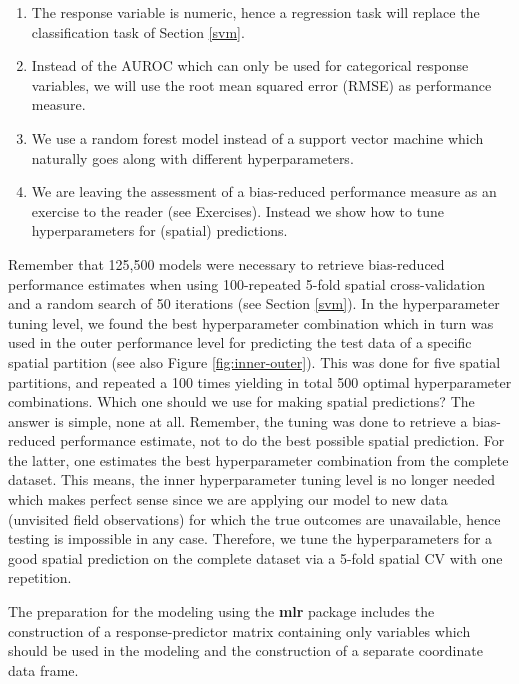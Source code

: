 \documentclass[]{krantz}
\providecommand{\tightlist}{%
  \setlength{\itemsep}{0pt}\setlength{\parskip}{0pt}}
\begin{document}
\begin{enumerate}
\def\labelenumi{\arabic{enumi}.}
\tightlist
\item
  The response variable is numeric, hence a regression task will replace the classification task of Section \ref{svm}.
\item
  Instead of the AUROC which can only be used for categorical response variables, we will use the root mean squared error (RMSE) as performance measure.
\item
  We use a random forest model instead of a support vector machine which naturally goes along with different hyperparameters.
\item
  We are leaving the assessment of a bias-reduced performance measure as an exercise to the reader (see Exercises).
  Instead we show how to tune hyperparameters for (spatial) predictions.
\end{enumerate}

Remember that 125,500 models were necessary to retrieve bias-reduced performance estimates when using 100-repeated 5-fold spatial cross-validation and a random search of 50 iterations (see Section \ref{svm}).
In the hyperparameter tuning level, we found the best hyperparameter combination which in turn was used in the outer performance level for predicting the test data of a specific spatial partition (see also Figure \ref{fig:inner-outer}).
This was done for five spatial partitions, and repeated a 100 times yielding in total 500 optimal hyperparameter combinations.
Which one should we use for making spatial predictions?
The answer is simple, none at all.
Remember, the tuning was done to retrieve a bias-reduced performance estimate, not to do the best possible spatial prediction.
For the latter, one estimates the best hyperparameter combination from the complete dataset.
This means, the inner hyperparameter tuning level is no longer needed which makes perfect sense since we are applying our model to new data (unvisited field observations) for which the true outcomes are unavailable, hence testing is impossible in any case.
Therefore, we tune the hyperparameters for a good spatial prediction on the complete dataset via a 5-fold spatial CV with one repetition.

The preparation for the modeling using the \textbf{mlr} package includes the construction of a response-predictor matrix containing only variables which should be used in the modeling and the construction of a separate coordinate data frame.
\end{document}
